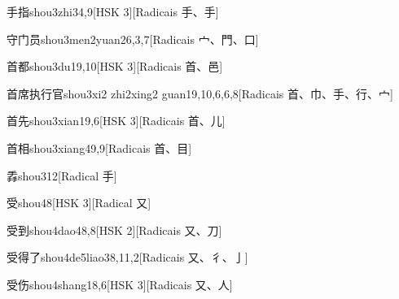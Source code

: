 \begin{entry}{手指}{shou3zhi3}{4,9}[HSK 3][Radicais ⼿、⼿]
\end{entry}

\begin{entry}{守门员}{shou3men2yuan2}{6,3,7}[Radicais ⼧、⾨、⼝]
\end{entry}

\begin{entry}{首都}{shou3du1}{9,10}[HSK 3][Radicais ⾸、⾢]
\end{entry}

\begin{entry}{首席执行官}{shou3xi2 zhi2xing2 guan1}{9,10,6,6,8}[Radicais ⾸、⼱、⼿、⾏、⼧]
\end{entry}

\begin{entry}{首先}{shou3xian1}{9,6}[HSK 3][Radicais ⾸、⼉]
\end{entry}

\begin{entry}{首相}{shou3xiang4}{9,9}[Radicais ⾸、⽬]
\end{entry}

\begin{entry}{掱}{shou3}{12}[Radical ⼿]
\end{entry}

\begin{entry}{受}{shou4}{8}[HSK 3][Radical ⼜]
\end{entry}

\begin{entry}{受到}{shou4dao4}{8,8}[HSK 2][Radicais ⼜、⼑]
\end{entry}

\begin{entry}{受得了}{shou4de5liao3}{8,11,2}[Radicais ⼜、⼻、⼅]
\end{entry}

\begin{entry}{受伤}{shou4shang1}{8,6}[HSK 3][Radicais ⼜、⼈]
\end{entry}


